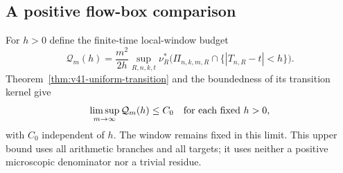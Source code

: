 \subsection{A positive flow-box comparison}
For $h>0$ define the finite-time local-window budget
\begin{equation}\label{eq:v46-window-budget}
 \mathcal Q_m(h)=\frac{m^2}{2h}
   \sup_{R,n,k,t}\nu_R^*
       \bigl(\Pi_{n,k,m,R}\cap\{|T_{n,R}-t|<h\}\bigr).
\end{equation}
Theorem~\ref{thm:v41-uniform-transition} and the boundedness of its
transition kernel give
\begin{equation}\label{eq:v46-window-budget-limit}
 \limsup_{m\to\infty}\mathcal Q_m(h)\le C_0
                         \quad\hbox{for each fixed }h>0,
\end{equation}
with $C_0$ independent of $h$. The window remains fixed in this limit.
This upper bound uses all arithmetic branches and all targets; it uses
neither a positive microscopic denominator nor a trivial residue.

